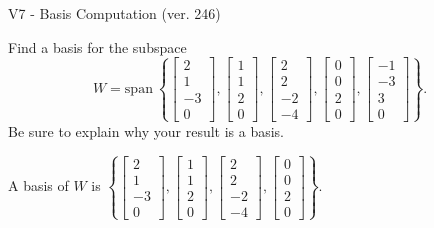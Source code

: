 \begin{exercise}
  \begin{exerciseTitle}V7 - Basis Computation (ver. 246)\end{exerciseTitle}
  \begin{exerciseStatement}
    Find a basis for the subspace 
\[W=\mathrm{span}\ \left\{\left[\begin{array}{r}
2 \\
1 \\
-3 \\
0
\end{array}\right] , \left[\begin{array}{r}
1 \\
1 \\
2 \\
0
\end{array}\right] , \left[\begin{array}{r}
2 \\
2 \\
-2 \\
-4
\end{array}\right] , \left[\begin{array}{r}
0 \\
0 \\
2 \\
0
\end{array}\right] , \left[\begin{array}{r}
-1 \\
-3 \\
3 \\
0
\end{array}\right]\right\}.\]
 Be sure to explain why your result is a basis.


  \end{exerciseStatement}
  \begin{exerciseAnswer}
   A basis of \(W\) is  \(\left\{\left[\begin{array}{r}
2 \\
1 \\
-3 \\
0
\end{array}\right] , \left[\begin{array}{r}
1 \\
1 \\
2 \\
0
\end{array}\right] , \left[\begin{array}{r}
2 \\
2 \\
-2 \\
-4
\end{array}\right] , \left[\begin{array}{r}
0 \\
0 \\
2 \\
0
\end{array}\right]\right\}\).
  


  \end{exerciseAnswer}
\end{exercise}